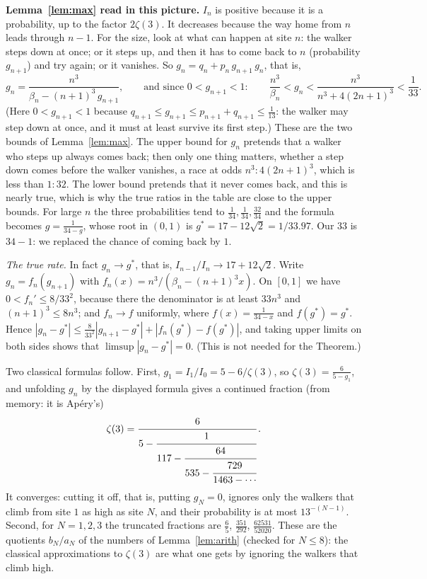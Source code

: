 \documentclass[11pt]{article}
\newcommand{\q}[1]{\medskip\noindent\textbf{#1}}
\begin{document}
\q{Lemma~\ref{lem:max} read in this picture.} $I_n$ is positive because it is a probability, up to
the factor $2\zeta(3)$. It decreases because the way home from $n$ leads through $n-1$. For the
size, look at what can happen at site $n$: the walker steps down at once; or it steps up, and then
it has to come back to $n$ (probability $g_{n+1}$) and try again; or it vanishes. So
$g_n=q_n+p_n\,g_{n+1}\,g_n$, that is,
\[
g_n=\frac{n^3}{\beta_n-(n+1)^3\,g_{n+1}},\qquad\text{and since }0<g_{n+1}<1:\qquad
\frac{n^3}{\beta_n}<g_n<\frac{n^3}{n^3+4(2n+1)^3}<\frac1{33} .
\]
(Here $0<g_{n+1}<1$ because $q_{n+1}\le g_{n+1}\le p_{n+1}+q_{n+1}\le\frac1{13}$: the walker may
step down at once, and it must at least survive its first step.) These are the two bounds of
Lemma~\ref{lem:max}. The upper bound for $g_n$ pretends that a walker
who steps up always comes back; then only one thing matters, whether a step down comes before the
walker vanishes, a race at odds $n^3:4(2n+1)^3$, which is less than $1:32$. The lower bound
pretends that it never comes back, and this is nearly true, which is why the true ratios in the
table are close to the upper bounds. For large $n$ the three probabilities tend to
$\frac1{34},\frac1{34},\frac{32}{34}$ and the formula becomes $g=\frac1{34-g}$, whose root in $(0,1)$ is
$g^*=17-12\sqrt2=1/33.97$. Our $33$ is $34-1$: we replaced the chance of coming back by $1$.

\emph{The true rate.} In fact $g_n\to g^*$, that is, $I_{n-1}/I_n\to17+12\sqrt2$. Write
$g_n=f_n(g_{n+1})$ with $f_n(x)=n^3/(\beta_n-(n+1)^3x)$. On $[0,1]$ we have $0<f_n'\le8/33^2$,
because there the denominator is at least $33n^3$ and $(n+1)^3\le8n^3$; and $f_n\to f$ uniformly,
where $f(x)=\frac1{34-x}$ and $f(g^*)=g^*$. Hence
$|g_n-g^*|\le\frac8{33^2}|g_{n+1}-g^*|+|f_n(g^*)-f(g^*)|$, and taking upper limits on both sides
shows that $\limsup|g_n-g^*|=0$. (This is not needed for the Theorem.)

Two classical formulas follow. First, $g_1=I_1/I_0=5-6/\zeta(3)$, so $\zeta(3)=\frac6{5-g_1}$, and
unfolding $g_n$ by the displayed formula gives a continued fraction (from memory: it is Ap\'ery's)
\[
\zeta(3)=\cfrac{6}{5-\cfrac{1}{117-\cfrac{64}{535-\cfrac{729}{1463-\cdots}}}}\,.
\]
It converges: cutting it off, that is, putting $g_N=0$, ignores only the walkers that climb from
site $1$ as high as site $N$, and their probability is at most $13^{-(N-1)}$. Second, for
$N=1,2,3$ the truncated fractions are $\frac65$, $\frac{351}{292}$, $\frac{62531}{52020}$. These
are the quotients $b_N/a_N$ of the numbers of Lemma~\ref{lem:arith} (checked for $N\le8$): the
classical approximations to $\zeta(3)$ are what one gets by ignoring the walkers that climb high.
\end{document}
